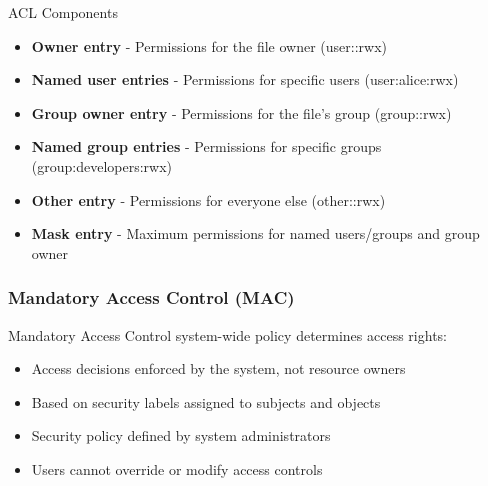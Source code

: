 \begin{concept}{ACL Components}
\begin{itemize}
    \item \textbf{Owner entry} - Permissions for the file owner (user::rwx)
    \item \textbf{Named user entries} - Permissions for specific users (user:alice:rwx)
    \item \textbf{Group owner entry} - Permissions for the file's group (group::rwx)
    \item \textbf{Named group entries} - Permissions for specific groups (group:developers:rwx)
    \item \textbf{Other entry} - Permissions for everyone else (other::rwx)
    \item \textbf{Mask entry} - Maximum permissions for named users/groups and group owner
\end{itemize}
\end{concept}


\subsubsection{Mandatory Access Control (MAC)}

\begin{definition}{Mandatory Access Control}
  system-wide policy determines access rights:
\begin{itemize}
    \item Access decisions enforced by the system, not resource owners
    \item Based on security labels assigned to subjects and objects
    \item Security policy defined by system administrators
    \item Users cannot override or modify access controls
\end{itemize}
\end{definition}

